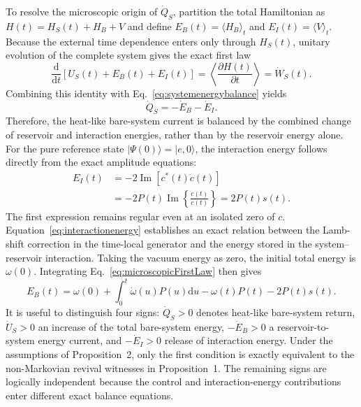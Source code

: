 \documentclass[reprint,superscriptaddress,floatfix,amsmath,amssymb,prresearch,aps]{revtex4-2}
\newcommand{\dd}{\mathrm{d}}
\newcommand{\Imm}{\operatorname{Im}}
\begin{document}
To resolve the microscopic origin of \(\dot Q_S\), partition the total
Hamiltonian as \(H(t)=H_S(t)+H_B+V\) and define
\(E_B(t)=\langle H_B\rangle_t\) and \(E_I(t)=\langle V\rangle_t\). Because the
external time dependence enters only through \(H_S(t)\), unitary evolution of
the complete system gives the exact first law
\begin{equation}
\frac{\dd}{\dd t}\left[U_S(t)+E_B(t)+E_I(t)\right]
=\left\langle\frac{\partial H(t)}{\partial t}\right\rangle
=\dot W_S(t).
\label{eq:microscopicFirstLaw}
\end{equation}
Combining this identity with Eq.~\eqref{eq:systemenergybalance} yields
\begin{equation}
\dot Q_S=-\dot E_B-\dot E_I.
\label{eq:strongbalance}
\end{equation}
Therefore, the heat-like bare-system current is balanced by the combined
change of reservoir and interaction energies, rather than by the reservoir
energy alone. For the pure reference state
\(|\Psi(0)\rangle=|e,0\rangle\), the interaction energy follows directly from
the exact amplitude equations:
\begin{align}
E_I(t)
&=-2\Imm\!\left[c^*(t)\dot c(t)\right]\nonumber\\
&=-2P(t)\Imm\!\left\{\frac{\dot c(t)}{c(t)}\right\}
=2P(t)s(t).
\label{eq:interactionenergy}
\end{align}
The first expression remains regular even at an isolated zero of \(c\).
Equation~\eqref{eq:interactionenergy} establishes an exact relation between
the Lamb-shift correction in the time-local generator and the energy stored in
the system--reservoir interaction. Taking the vacuum energy as zero, the
initial total energy is \(\omega(0)\). Integrating
Eq.~\eqref{eq:microscopicFirstLaw} then gives
\begin{equation}
E_B(t)=\omega(0)+\int_0^t\dot\omega(u)P(u)\dd u
-\omega(t)P(t)-2P(t)s(t).
\label{eq:bathenergy}
\end{equation}
It is useful to distinguish four signs: \(\dot Q_S>0\) denotes heat-like
bare-system return, \(\dot U_S>0\) an increase of the total bare-system
energy, \(-\dot E_B>0\) a reservoir-to-system energy current, and
\(-\dot E_I>0\) release of interaction energy.
Under the assumptions of Proposition~2, only the first condition is exactly
equivalent to the non-Markovian revival witnesses in Proposition~1. The
remaining signs are logically independent because the control and
interaction-energy contributions enter different exact balance equations.
\end{document}
